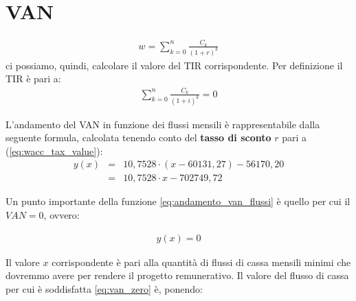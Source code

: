 \section[VAN]{VAN}
	\begin{equation}
	\label{eq:van}
	\begin{split}
 		w = \sum_{k=0}^n \frac{C_k}{(1+r)^k}
	\end{split}
	\end{equation}
	ci possiamo, quindi, calcolare il valore del \ac{TIR} corrispondente. Per definizione il \ac{TIR} è pari a:
	\begin{equation}
	\label{eq:tir}
	\begin{split}
 		\sum_{k=0}^n \frac{C_k}{(1+i)^k} = 0
	\end{split}
	\end{equation}	 

	L'andamento del \ac{VAN} in funzione dei flussi mensili è rappresentabile dalla seguente formula, calcolata tenendo conto del \textbf{tasso di sconto} $r$ pari a (\ref{eq:wacc_tax_value}):	
	\begin{eqnarray}
	\label{eq:andamento_van_flussi}
 		y(x) & = & 10,7528 \cdot ( x - 60131,27 ) - 56170,20		\nonumber \\
 			 & = & 10,7528 \cdot x - 702749,72
	\end{eqnarray}


Un punto importante della funzione \ref{eq:andamento_van_flussi} è quello per cui il $ VAN = 0 $, ovvero:

	\begin{equation}
	\label{eq:van_zero}
	\begin{split}
 		y(x) = 0
 	\end{split}
	\end{equation}

Il valore $x$ corrispondente è pari alla quantità di flussi di cassa mensili minimi che dovremmo avere per rendere il progetto remunerativo. Il valore del flusso di cassa per cui è soddisfatta \ref{eq:van_zero} è, ponendo:
			
